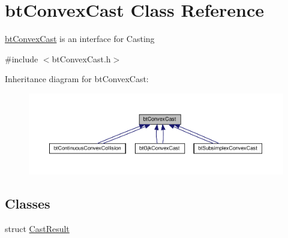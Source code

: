 \hypertarget{classbtConvexCast}{}\section{bt\+Convex\+Cast Class Reference}
\label{classbtConvexCast}


\hyperlink{classbtConvexCast}{bt\+Convex\+Cast} is an interface for Casting  




{\ttfamily \#include $<$bt\+Convex\+Cast.\+h$>$}



Inheritance diagram for bt\+Convex\+Cast\+:
\nopagebreak
\begin{figure}[H]
\begin{center}
\leavevmode
\includegraphics[width=350pt]{classbtConvexCast__inherit__graph}
\end{center}
\end{figure}
\subsection*{Classes}
\begin{DoxyCompactItemize}
\item 
struct \hyperlink{structbtConvexCast_1_1CastResult}{Cast\+Result}
\end{DoxyCompactItemize}
